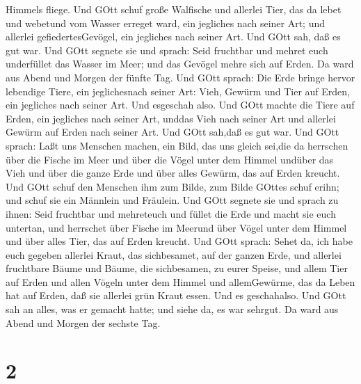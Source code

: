 Himmels fliege.  Und GOtt schuf große Walfische und
allerlei Tier, das da lebet und webetund vom Wasser erreget ward, ein
jegliches nach seiner Art; und allerlei gefiedertesGevögel, ein
jegliches nach seiner Art. Und GOtt sah, daß es gut war. 
Und GOtt segnete sie und sprach: Seid fruchtbar und mehret euch
underfüllet das Wasser im Meer; und das Gevögel mehre sich auf Erden.
 Da ward aus Abend und Morgen der fünfte Tag. 
Und GOtt sprach: Die Erde bringe hervor lebendige Tiere, ein
jeglichesnach seiner Art: Vieh, Gewürm und Tier auf Erden, ein jegliches
nach seiner Art. Und esgeschah also.  Und GOtt machte die
Tiere auf Erden, ein jegliches nach seiner Art, unddas Vieh nach seiner
Art und allerlei Gewürm auf Erden nach seiner Art. Und GOtt sah,daß es
gut war.  Und GOtt sprach: Laßt uns Menschen machen, ein
Bild, das uns gleich sei,die da herrschen über die Fische im Meer und
über die Vögel unter dem Himmel undüber das Vieh und über die ganze Erde
und über alles Gewürm, das auf Erden kreucht.  Und GOtt
schuf den Menschen ihm zum Bilde, zum Bilde GOttes schuf erihn; und
schuf sie ein Männlein und Fräulein.  Und GOtt segnete sie
und sprach zu ihnen: Seid fruchtbar und mehreteuch und füllet die Erde
und macht sie euch untertan, und herrschet über Fische im Meerund über
Vögel unter dem Himmel und über alles Tier, das auf Erden kreucht.
 Und GOtt sprach: Sehet da, ich habe euch gegeben allerlei
Kraut, das sichbesamet, auf der ganzen Erde, und allerlei fruchtbare
Bäume und Bäume, die sichbesamen, zu eurer Speise,  und
allem Tier auf Erden und allen Vögeln unter dem Himmel und allemGewürme,
das da Leben hat auf Erden, daß sie allerlei grün Kraut essen. Und es
geschahalso.  Und GOtt sah an alles, was er gemacht hatte;
und siehe da, es war sehrgut. Da ward aus Abend und Morgen der sechste
Tag.

\hypertarget{section-1}{%
\section{2}\label{section-1}}

